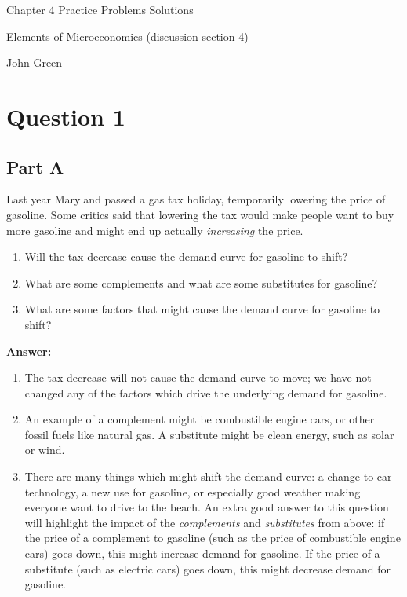 \documentclass[12pt]{article}
\begin{document}
\begin{center}
\Large Chapter 4 Practice Problems Solutions

\medskip

\normalsize Elements of Microeconomics (discussion section 4)

\medskip

\small John Green
\end{center}

\medskip

\section*{Question 1}
\subsection*{Part A}
Last year Maryland passed a gas tax holiday, temporarily lowering the price of gasoline. Some critics said that lowering the tax would make people want to buy more gasoline and might end up actually \textit{increasing} the price.

\begin{enumerate}
    \item Will the tax decrease cause the demand curve for gasoline to shift?
    \item What are some complements and what are some substitutes for gasoline?
    \item What are some factors that might cause the demand curve for gasoline to shift?
\end{enumerate}

\textbf{Answer:}

\begin{enumerate}
    \item The tax decrease will not cause the demand curve to move; we have not changed any of the factors which drive the underlying demand for gasoline.
    \item An example of a complement might be combustible engine cars, or other fossil fuels like natural gas. A substitute might be clean energy, such as solar or wind.
    \item There are many things which might shift the demand curve: a change to car technology, a new use for gasoline, or especially good weather making everyone want to drive to the beach. An extra good answer to this question will highlight the impact of the \textit{complements} and \textit{substitutes} from above: if the price of a complement to gasoline (such as the price of combustible engine cars) goes down, this might increase demand for gasoline. If the price of a substitute (such as electric cars) goes down, this might decrease demand for gasoline.
\end{enumerate}
\end{document}
